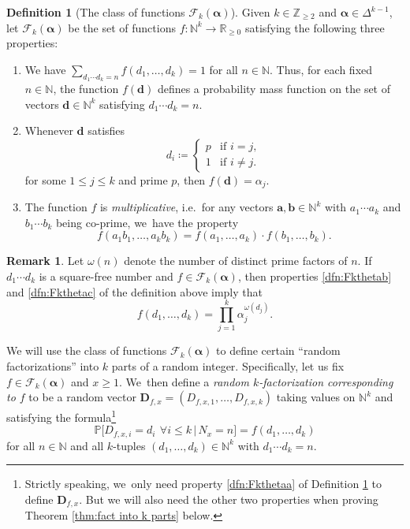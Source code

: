 \documentclass[10pt,a4paper]{amsart}
\providecommand{\ie}{i.e.\ }
\newenvironment{enumeratea}
{\bgroup\def\theenumi{\alph{enumi}}\begin{enumerate}}
{\end{enumerate}\egroup}
\newcommand{\ba}{{\boldsymbol a}}
\newcommand{\bb}{{\boldsymbol b}}
\newcommand{\bd}{{\boldsymbol d}}
\newcommand{\bD}{{\boldsymbol D}}
\newcommand{\NN}{\mathbb{N}}
\newcommand{\ZZ}{\mathbb{Z}}
\newcommand{\RR}{\mathbb{R}}
\newcommand{\PP}{\mathbb{P}}
\newcommand{\boldalpha}{\boldsymbol{\alpha}}
\newcommand{\simplex}{\Delta^{k-1}}
\newcommand{\bgg}{\Big}
\theoremstyle{plain}
\theoremstyle{definition}
\newtheorem{deff}[cor]{Definition}
\newtheorem*{rems}{Remark}
\providecommand{\ie}{i.e. }
\begin{document}
\begin{deff}[The class of functions $\mathcal F_k(\boldalpha)$]\label{dfn:Fktheta}
Given $k\in\ZZ_{\ge2}$ and $\boldalpha\in \simplex$, let $\mathcal F_k(\boldalpha)$ be the set of functions $f \colon \NN^{k} \to \RR_{ \ge 0}$ satisfying the following three properties:
\begin{enumeratea}
\item\label{dfn:Fkthetaa} We have $\sum_{d_1\cdots d_k = n} f(d_1, \ldots, d_k) = 1$ for all $n \in \NN$. Thus, for each fixed $n \in \NN$, the function $f(\bd)$ defines a probability mass function on the set of vectors $\bd \in \NN^k$ satisfying $d_1\cdots d_k = n$.

\item\label{dfn:Fkthetab} Whenever $\bd$ satisfies
\[
d_i \coloneqq \begin{cases}
p &\text{if $i = j$}, \\
1 &\text{if $i \ne j$}.
\end{cases}
\]
for some $1 \le j \le k$ and prime $p$, then $f(\bd) = \alpha_j$.

\item\label{dfn:Fkthetac} The function $f$ is \emph{multiplicative}, \ie for any vectors $\ba, \bb \in \NN^k$ with $a_1\cdots a_k$ and $b_1 \cdots b_k$ being co-prime, we~have the property
\[
f(a_1b_1, \ldots, a_kb_k) = f(a_1, \ldots, a_k) \cdot f(b_1, \ldots, b_k).
\]
\end{enumeratea}
\end{deff}

\begin{rems}
Let $\omega(n)$ denote the number of distinct prime factors of $n$. If~$d_1\cdots d_k$ is a square-free number and $f\in\mathcal{F}_k (\boldalpha)$, then properties \eqref{dfn:Fkthetab} and \eqref{dfn:Fkthetac} of the definition above imply that
\begin{equation}
\label{eq:f on squarefrees}
f(d_1,\dots,d_k) = \prod_{j=1}^k \alpha_j^{\omega(d_j)}.
\end{equation}
\end{rems}

We will use the class of functions $\mathcal{F}_k(\boldalpha)$ to define certain ``random factorizations'' into $k$ parts of a random integer. Specifically, let us fix $f\in\mathcal{F}_k(\boldalpha)$ and $x\ge1$. We~then define a {\it random $k$-factorization corresponding to $f$} to be a random vector $\bD_{f, x}=(D_{f,x,1},\dots,D_{f,x,k})$ taking values on $\NN^k$ and satisfying the formula\footnote{Strictly speaking, we~only need property \eqref{dfn:Fkthetaa} of Definition \ref{dfn:Fktheta} to define $\bD_{f,x}$. But we will also need the other two properties when proving Theorem \ref{thm:fact into k parts} below.}
\begin{equation}
\label{eq:prob mass function f}
\PP\bgg[D_{f,x,i} = d_i \ \, \forall i \le k\, \bgg|\, N_x = n\bgg] = f(d_1, \ldots, d_k)
\end{equation}
for all $n\in\NN$ and all $k$-tuples $(d_1,\dots,d_k)\in\NN^k$ with $d_1\cdots d_k=n$.
\end{document}
